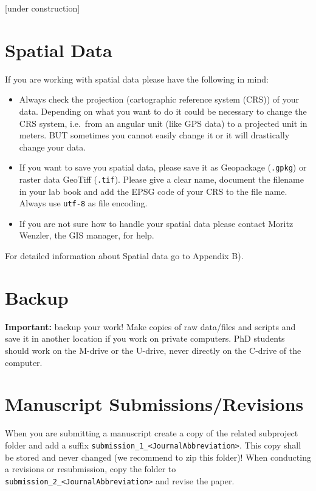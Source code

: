 \documentclass[
  english,
]{article}
\providecommand{\tightlist}{%
  \setlength{\itemsep}{0pt}\setlength{\parskip}{0pt}}
\begin{document}
{[}under construction{]}

\hypertarget{spatial-data}{%
\section{Spatial Data}\label{spatial-data}}

If you are working with spatial data please have the following in mind:

\begin{itemize}
\tightlist
\item
  Always check the projection (cartographic reference system (CRS)) of
  your data. Depending on what you want to do it could be necessary to
  change the CRS system, i.e.~from an angular unit (like GPS data) to a
  projected unit in meters. BUT sometimes you cannot easily change it or
  it will drastically change your data.
\item
  If you want to save you spatial data, please save it as Geopackage
  (\texttt{.gpkg}) or raster data GeoTiff (\texttt{.tif}). Please give a
  clear name, document the filename in your lab book and add the EPSG
  code of your CRS to the file name. Always use \texttt{utf-8} as file
  encoding.
\item
  If you are not sure how to handle your spatial data please contact
  Moritz Wenzler, the GIS manager, for help.
\end{itemize}

For detailed information about Spatial data go to Appendix B).

\hypertarget{backup}{%
\section{Backup}\label{backup}}

\textbf{Important:} backup your work! Make copies of raw data/files and
scripts and save it in another location if you work on private
computers. PhD students should work on the M-drive or the U-drive, never
directly on the C-drive of the computer.

\hypertarget{manuscript-submissionsrevisions}{%
\section{Manuscript
Submissions/Revisions}\label{manuscript-submissionsrevisions}}

When you are submitting a manuscript create a copy of the related
subproject folder and add a suffix
\texttt{submission\_1\_\textless{}JournalAbbreviation\textgreater{}}.
This copy shall be stored and never changed (we recommend to zip this
folder)! When conducting a revisions or resubmission, copy the folder to
\texttt{submission\_2\_\textless{}JournalAbbreviation\textgreater{}} and
revise the paper.
\end{document}
